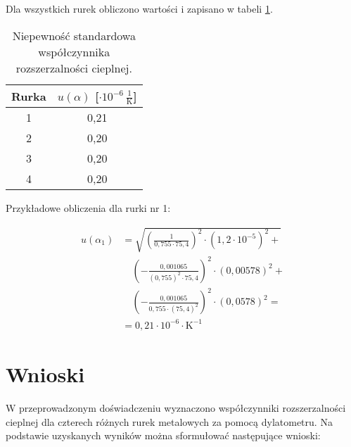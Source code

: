 \documentclass[a4paper,12pt]{article}
\begin{document}
Dla wszystkich rurek obliczono wartości i zapisano w tabeli \ref{tab:niepewnosci_wspolczynnik_rozszerzalnosci}.

\begin{table}[H]
    \centering
    \begin{tabular}{|c|c|}
        \hline
        Rurka & $u(\alpha)$ [$\cdot 10^{-6}\,\frac{1}{\text{K}}$] \\
        \hline
        1 & 0,21 \\
        2 & 0,20 \\
        3 & 0,20 \\
        4 & 0,20 \\
        \hline
    \end{tabular}
    \caption{Niepewność standardowa współczynnika rozszerzalności cieplnej.}
    \label{tab:niepewnosci_wspolczynnik_rozszerzalnosci}
\end{table}

Przykładowe obliczenia dla rurki nr 1:

\begin{align*}
    u(\alpha_1) & = \sqrt{\left(\frac{1}{0{,}755 \cdot 75{,}4}\right)^2 \cdot (1{,}2 \cdot 10^{-5})^2 +}  \\
                & \quad \left(-\frac{0{,}001065}{(0{,}755)^2 \cdot 75{,}4}\right)^2 \cdot (0{,}00578)^2 + \\
                & \quad \left(-\frac{0{,}001065}{0{,}755 \cdot (75{,}4)^2}\right)^2 \cdot (0{,}0578)^2 =  \\
                & = 0{,}21 \cdot 10^{-6} \cdot \text{K}^{-1}
\end{align*}

\section{Wnioski}

W przeprowadzonym doświadczeniu wyznaczono współczynniki rozszerzalności cieplnej dla czterech różnych rurek metalowych za pomocą dylatometru. Na podstawie uzyskanych wyników można sformułować następujące wnioski:
\end{document}
